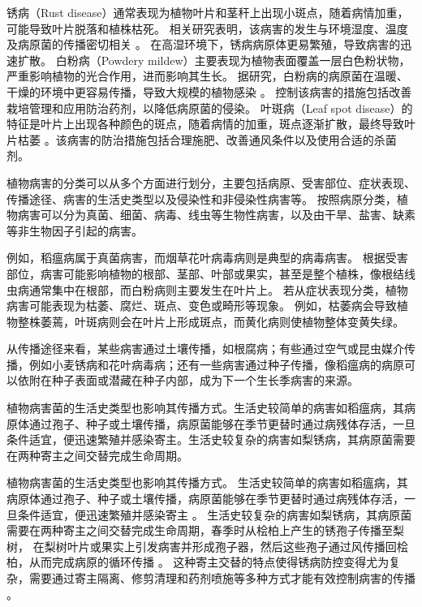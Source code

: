 \documentclass[AutoFakeBold]{LZUThesis-PgD&PhD}
\begin{document}
	锈病（Rust disease）通常表现为植物叶片和茎秆上出现小斑点，随着病情加重，可能导致叶片脱落和植株枯死。
	相关研究表明，该病害的发生与环境湿度、温度及病原菌的传播密切相关 \cite{mendgen2002plant, huber1992modeling}。
	在高湿环境下，锈病病原体更易繁殖，导致病害的迅速扩散。
	白粉病（Powdery mildew）主要表现为植物表面覆盖一层白色粉状物，严重影响植物的光合作用，进而影响其生长。
	据研究，白粉病的病原菌在温暖、干燥的环境中更容易传播，导致大规模的植物感染 \cite{glawe2008powdery, yarwood1957powdery}。
	控制该病害的措施包括改善栽培管理和应用防治药剂，以降低病原菌的侵染。
	叶斑病（Leaf spot disease）的特征是叶片上出现各种颜色的斑点，随着病情的加重，斑点逐渐扩散，最终导致叶片枯萎 \cite{agrios2005plant, thomma2003alternaria}。该病害的防治措施包括合理施肥、改善通风条件以及使用合适的杀菌剂。	
	
	植物病害的分类可以从多个方面进行划分，主要包括病原、受害部位、症状表现、传播途径、病害的生活史类型以及侵染性和非侵染性病害等。
	按照病原分类，植物病害可以分为真菌、细菌、病毒、线虫等生物性病害，以及由干旱、盐害、缺素等非生物因子引起的病害。
	
	例如，稻瘟病属于真菌病害，而烟草花叶病毒病则是典型的病毒病害\cite{goldbach2001tobacco, desselberger2015viruses}。
	根据受害部位，病害可能影响植物的根部、茎部、叶部或果实，甚至是整个植株，像根结线虫病通常集中在根部，而白粉病则主要发生在叶片上\cite{glawe2008powdery}。
	若从症状表现分类，植物病害可能表现为枯萎、腐烂、斑点、变色或畸形等现象。
	例如，枯萎病会导致植物整株萎蔫，叶斑病则会在叶片上形成斑点，而黄化病则使植物整体变黄失绿\cite{watson2009comparing}。

	从传播途径来看，某些病害通过土壤传播，如根腐病；有些通过空气或昆虫媒介传播，例如小麦锈病和花叶病毒病；还有一些病害通过种子传播，像稻瘟病的病原可以依附在种子表面或潜藏在种子内部，成为下一个生长季病害的来源\cite{zeigler1996rice, kamoun2005late}。
	
	植物病害菌的生活史类型也影响其传播方式。生活史较简单的病害如稻瘟病，其病原体通过孢子、种子或土壤传播，病原菌能够在季节更替时通过病残体存活，一旦条件适宜，便迅速繁殖并感染寄主\cite{zeigler1996rice}。生活史较复杂的病害如梨锈病，其病原菌需要在两种寄主之间交替完成生命周期\cite{jacquemart2015life}。
	
	植物病害菌的生活史类型也影响其传播方式。
	生活史较简单的病害如稻瘟病，其病原体通过孢子、种子或土壤传播，病原菌能够在季节更替时通过病残体存活，一旦条件适宜，便迅速繁殖并感染寄主 \cite{qiu2010}。
	生活史较复杂的病害如梨锈病，其病原菌需要在两种寄主之间交替完成生命周期，春季时从桧柏上产生的锈孢子传播至梨树，
	在梨树叶片或果实上引发病害并形成孢子器，然后这些孢子通过风传播回桧柏，从而完成病原的循环传播 \cite{yu2018}。
	这种寄主交替的特点使得锈病防控变得尤为复杂，需要通过寄主隔离、修剪清理和药剂喷施等多种方式才能有效控制病害的传播 \cite{palmieri2022}。
\end{document}
